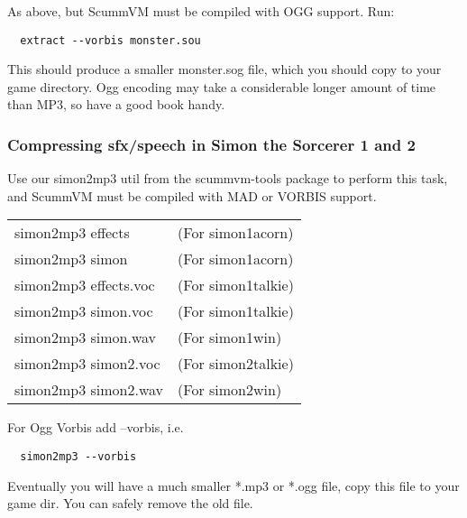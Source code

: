 As above, but ScummVM must be compiled with OGG support. Run:
\begin{verbatim}
  extract --vorbis monster.sou
\end{verbatim}
%
This should produce a smaller monster.sog file, which you should copy to your
game directory. Ogg encoding may take a considerable longer amount of time
than MP3, so have a good book handy.


\subsubsection{Compressing sfx/speech in Simon the Sorcerer 1 and 2}

Use our simon2mp3 util from the scummvm-tools package to perform
this task, and ScummVM must be compiled with MAD or VORBIS support.\\

\begin{tabular}[h]{ll}
  simon2mp3 effects    &(For simon1acorn)\\
  simon2mp3 simon      &(For simon1acorn)\\
  simon2mp3 effects.voc&(For simon1talkie)\\
  simon2mp3 simon.voc  &(For simon1talkie)\\
  simon2mp3 simon.wav  &(For simon1win)\\
  simon2mp3 simon2.voc &(For simon2talkie)\\
  simon2mp3 simon2.wav &(For simon2win)\\
\end{tabular}

For Ogg Vorbis add --vorbis, i.e.
\begin{verbatim}
  simon2mp3 --vorbis
\end{verbatim}
%
Eventually you will have a much smaller *.mp3 or *.ogg file, copy this
file to your game dir. You can safely remove the old file.

